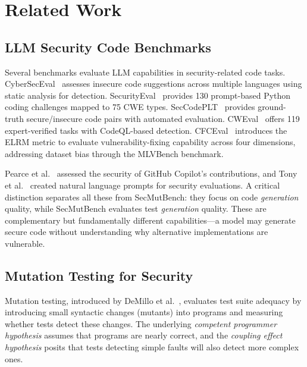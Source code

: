 \documentclass[sigconf,anonymous,review]{acmart}
\begin{document}
\section{Related Work}\label{sec:related}

\subsection{LLM Security Code Benchmarks}

Several benchmarks evaluate LLM capabilities in security-related code tasks. CyberSecEval~\cite{bhatt2023cyberseceval} assesses insecure code suggestions across multiple languages using static analysis for detection. SecurityEval~\cite{siddiq2022securityeval} provides 130 prompt-based Python coding challenges mapped to 75 CWE types. SecCodePLT~\cite{secccodeplt2024} provides ground-truth secure/insecure code pairs with automated evaluation. CWEval~\cite{yang2024cweval} offers 119 expert-verified tasks with CodeQL-based detection. CFCEval~\cite{cheng2025cfceval} introduces the ELRM metric to evaluate vulnerability-fixing capability across four dimensions, addressing dataset bias through the MLVBench benchmark.

Pearce et al.~\cite{pearce2022asleep} assessed the security of GitHub Copilot's contributions, and Tony et al.~\cite{tony2023llmseceval} created natural language prompts for security evaluations. A critical distinction separates all these from SecMutBench: they focus on code \emph{generation} quality, while SecMutBench evaluates test \emph{generation} quality. These are complementary but fundamentally different capabilities---a model may generate secure code without understanding why alternative implementations are vulnerable.

\subsection{Mutation Testing for Security}

Mutation testing, introduced by DeMillo et al.~\cite{demillo1978hints}, evaluates test suite adequacy by introducing small syntactic changes (mutants) into programs and measuring whether tests detect these changes. The underlying \emph{competent programmer hypothesis} assumes that programs are nearly correct, and the \emph{coupling effect hypothesis} posits that tests detecting simple faults will also detect more complex ones.
\end{document}
